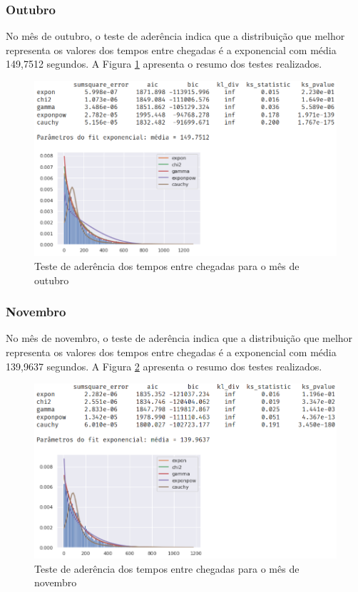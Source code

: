 \subsubsection*{Outubro}
No mês de outubro, o teste de aderência indica que a distribuição que melhor representa os valores dos tempos entre chegadas é a exponencial com média 149,7512 segundos. A Figura \ref*{fig: fit-outubro} apresenta o resumo dos testes realizados.

\begin{figure}[H]
    \includegraphics[scale=0.8]{analise-de-dados/fit/fit-outubro.png}
    \caption{Teste de aderência dos tempos entre chegadas para o mês de outubro}
    \label{fig: fit-outubro}
\end{figure}

\subsubsection*{Novembro}
No mês de novembro, o teste de aderência indica que a distribuição que melhor representa os valores dos tempos entre chegadas é a exponencial com média 139,9637 segundos. A Figura \ref*{fig: fit-novembro} apresenta o resumo dos testes realizados.

\begin{figure}[H]
    \includegraphics[scale=0.8]{analise-de-dados/fit/fit-novembro.png}
    \caption{Teste de aderência dos tempos entre chegadas para o mês de novembro}
    \label{fig: fit-novembro}
\end{figure}

